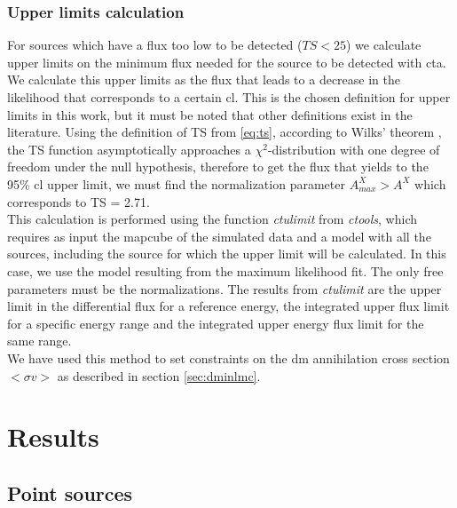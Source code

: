 \documentclass[main.tex]{subfiles}
\begin{document}
\subsubsection{Upper limits calculation} \label{sec:ulimits}

For sources which have a flux too low to be detected ($TS < 25$) we calculate upper limits on the minimum flux needed for the source to be detected with \gls{cta}. We calculate this upper limits as the flux that leads to a decrease in the likelihood that corresponds to a certain \gls{cl}. This is the chosen definition for upper limits in this work, but it must be noted that other definitions exist in the literature.
Using the definition of TS from \ref{eq:ts}, according to Wilks' theorem \cite{wilks1938}, the TS function asymptotically approaches a $\chi^2$-distribution with one degree of freedom under the null hypothesis, therefore to get the flux that yields to the 95\% \gls{cl} upper limit, we must find the normalization parameter $A^X_{max} > A^{X}$ which corresponds to TS = 2.71.\\
This calculation is performed using the function \textit{ctulimit} from \textit{ctools}, which requires as input the mapcube of the simulated data and a model with all the sources, including the source for which the upper limit will be calculated. In this case, we use the model resulting from the maximum likelihood fit. The only free parameters must be the normalizations. The results from \textit{ctulimit} are the upper limit in the differential flux for a reference energy, the integrated upper flux limit for a specific energy range and the integrated upper energy flux limit for the same range.\\
We have used this method to set constraints on the \gls{dm} annihilation cross section $<\sigma v>$ as described in section \ref{sec:dminlmc}.

\section{Results}\label{sec:results}
        
\subsection{Point sources}
\end{document}
